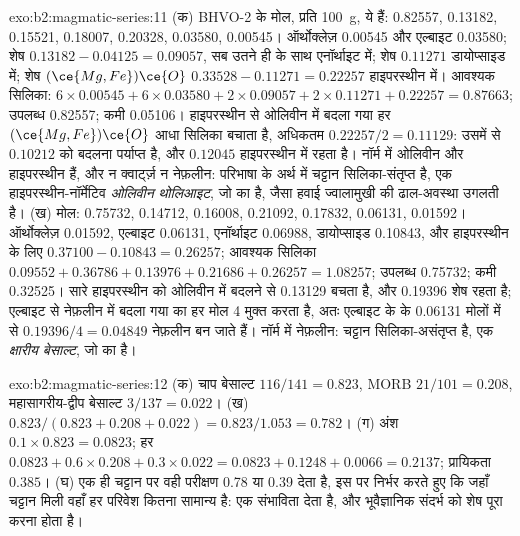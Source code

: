 \begin{solution}{exo:b2:magmatic-series:11}
(क) BHVO-2 के मोल, प्रति \qty{100}{g}, ये हैं:  0.82557,  0.13182, 
0.15521,  0.18007,  0.20328,  0.03580,  0.00545।
ऑर्थोक्लेज़ 0.00545 और एल्बाइट 0.03580; शेष  $0.13182 - 0.04125 = 0.09057$,
सब उतने ही  के साथ एनॉर्थाइट में; शेष  $0.11271$ डायोप्साइड में;
शेष $(\ce{Mg,Fe})\ce{O}$ $0.33528 - 0.11271 = 0.22257$ हाइपरस्थीन में। आवश्यक
सिलिका: $6\times0.00545 + 6\times0.03580 + 2\times0.09057 + 2\times0.11271 + 0.22257 =
0.87663$; उपलब्ध 0.82557; कमी 0.05106। हाइपरस्थीन से ओलिवीन में बदला गया हर $(\ce{Mg,Fe})\ce{O}$
आधा सिलिका बचाता है, अधिकतम $0.22257/2 = 0.11129$: उसमें से
$0.10212$ को बदलना पर्याप्त है, और $0.12045$ हाइपरस्थीन में रहता है। नॉर्म में ओलिवीन
और हाइपरस्थीन हैं, और न क्वार्ट्ज़ न नेफ़लीन: परिभाषा के अर्थ में चट्टान सिलिका-संतृप्त है,
एक हाइपरस्थीन-नॉर्मेटिव \emph{ओलिवीन थोलिआइट}, जो
 का है, जैसा हवाई ज्वालामुखी की ढाल-अवस्था उगलती है। (ख) मोल: 0.75732, 0.14712, 0.16008, 0.21092, 0.17832, 0.06131,
0.01592। ऑर्थोक्लेज़ 0.01592, एल्बाइट 0.06131, एनॉर्थाइट 0.06988, डायोप्साइड 0.10843, और हाइपरस्थीन के लिए $0.37100 - 0.10843 =
0.26257$; आवश्यक सिलिका $0.09552 + 0.36786 + 0.13976 + 0.21686 + 0.26257 = 1.08257$;
उपलब्ध 0.75732; कमी 0.32525। सारे हाइपरस्थीन को ओलिवीन में बदलने से
0.13129 बचता है, और 0.19396 शेष रहता है; एल्बाइट से नेफ़लीन में बदला गया  का हर मोल
4  मुक्त करता है, अतः एल्बाइट के  के 0.06131 मोलों में से
$0.19396/4 = 0.04849$ नेफ़लीन बन जाते हैं। नॉर्म में नेफ़लीन: चट्टान
सिलिका-असंतृप्त है, एक \emph{क्षारीय बेसाल्ट}, जो  का है।
\end{solution}

\begin{solution}{exo:b2:magmatic-series:12}
(क) चाप बेसाल्ट $116/141 = 0.823$, MORB $21/101 = 0.208$, महासागरीय-द्वीप बेसाल्ट
$3/137 = 0.022$। (ख) $0.823/(0.823 + 0.208 + 0.022) = 0.823/1.053 = 0.782$।
(ग) अंश $0.1\times0.823 = 0.0823$; हर $0.0823 + 0.6\times0.208 +
0.3\times0.022 = 0.0823 + 0.1248 + 0.0066 = 0.2137$; प्रायिकता $0.385$। (घ)
एक ही चट्टान पर वही परीक्षण 0.78 या 0.39 देता है, इस पर निर्भर करते हुए कि जहाँ चट्टान मिली वहाँ
हर परिवेश कितना सामान्य है:  एक संभाविता देता है, और
भूवैज्ञानिक संदर्भ को शेष पूरा करना होता है।
\end{solution}


